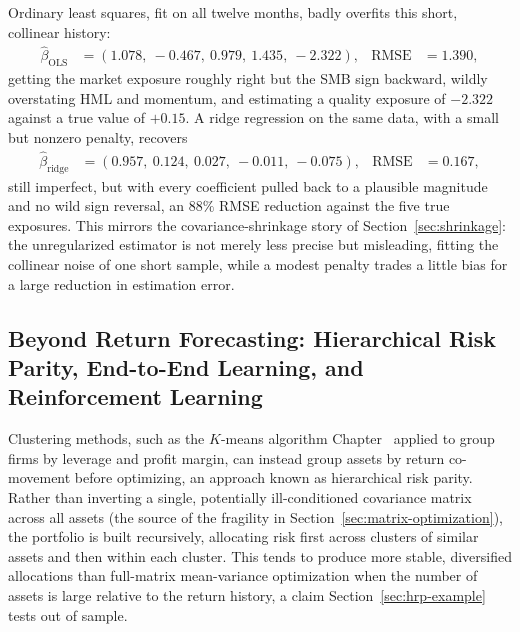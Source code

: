 \documentclass[../ai_in_finance]{subfiles}
\begin{document}
Ordinary least squares, fit on all twelve months, badly overfits this short, collinear history:
\begin{align*}
\hat\beta_{\text{OLS}} &= (1.078,\ -0.467,\ 0.979,\ 1.435,\ -2.322), & \text{RMSE} &= 1.390,
\end{align*}
getting the market exposure roughly right but the SMB sign backward, wildly overstating HML and momentum, and estimating a quality exposure of $-2.322$ against a true value of $+0.15$. A ridge regression on the same data, with a small but nonzero penalty, recovers
\begin{align*}
\hat\beta_{\text{ridge}} &= (0.957,\ 0.124,\ 0.027,\ -0.011,\ -0.075), & \text{RMSE} &= 0.167,
\end{align*}
still imperfect, but with every coefficient pulled back to a plausible magnitude and no wild sign reversal, an $88\%$ RMSE reduction against the five true exposures. This mirrors the covariance-shrinkage story of Section~\ref{sec:shrinkage}: the unregularized estimator is not merely less precise but misleading, fitting the collinear noise of one short sample, while a modest penalty trades a little bias for a large reduction in estimation error.

\subsection{Beyond Return Forecasting: Hierarchical Risk Parity, End-to-End Learning, and Reinforcement Learning}
\label{sec:ml-beyond-forecasting}

Clustering methods, such as the $K$-means algorithm Chapter~ applied to group firms by leverage and profit margin, can instead group assets by return co-movement before optimizing, an approach known as hierarchical risk parity. Rather than inverting a single, potentially ill-conditioned covariance matrix across all assets (the source of the fragility in Section~\ref{sec:matrix-optimization}), the portfolio is built recursively, allocating risk first across clusters of similar assets and then within each cluster.
This tends to produce more stable, diversified allocations than full-matrix mean-variance optimization when the number of assets is large relative to the return history, a claim Section~\ref{sec:hrp-example} tests out of sample.
\end{document}
